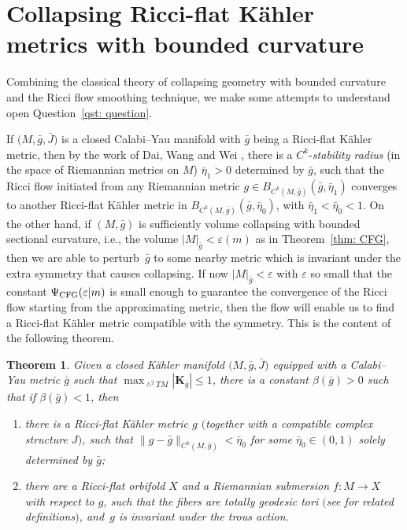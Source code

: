 \documentclass[10pt,a4paper]{amsart}
\numberwithin{equation}{section}
\newtheorem{Theorem}{Theorem}[section]
\begin{document}
\section{Collapsing Ricci-flat K\"ahler metrics with bounded curvature}\label{section5}
Combining the classical theory of collapsing geometry with bounded curvature
and the Ricci flow smoothing technique, we make some attempts to understand open Question~\ref{qst: question}.

If $\big(M,\bar{g},\bar{J}\big)$ is a closed Calabi--Yau manifold with $\bar{g}$ being a
Ricci-flat K\"ahler metric, then by the work of Dai, Wang and Wei \cite{DWW07},
there is a $C^k$-\emph{stability radius} (in the space of Riemannian metrics on
$M$) $\bar{\eta}_1>0$ determined by $\bar{g}$, such that the Ricci
flow initiated from any Riemannian metric $g\in
B_{C^k(M,\bar{g})}(\bar{g},\bar{\eta}_1)$ converges to another Ricci-flat
K\"ahler metric in $B_{C^k(M,\bar{g})}(\bar{g},\bar{\eta}_0)$, with
$\bar{\eta}_1<\bar{\eta}_0<1$. On the other hand, if $(M,\bar{g})$ is
sufficiently volume collapsing with bounded sectional curvature, i.e., the
volume $|M|_{\bar{g}}<\varepsilon(m)$ as in Theorem~\ref{thm: CFG}, then we are
able to perturb~$\bar{g}$ to some nearby metric which is invariant under the
extra symmetry that causes collapsing. If now $|M|_{\bar{g}}<\varepsilon$ with
$\varepsilon$ so small that the constant $\Psi_{\rm CFG}(\varepsilon|m)$ is small
enough to guarantee the convergence of the Ricci flow starting from the
approximating metric, then the flow will enable us to find a Ricci-flat
K\"ahler metric compatible with the symmetry. This is the content of the
following theorem.
\begin{Theorem}\label{thm: main}
Given a closed K\"ahler manifold $\big(M,\bar{g},\bar{J}\big)$ equipped with a
Calabi--Yau metric $\bar{g}$ such that
$\max_{\wedge^2TM} |\mathbf{K}_{\bar{g}} |\le 1$, there is a constant
$\beta(\bar{g})>0$ such that if $\beta(\bar{g})<1$, then
\begin{enumerate}\itemsep=0pt
 \item[$1)$] there is a Ricci-flat K\"ahler metric $g$ $($together with a compatible
 complex structure $J)$, such that $ \|g-\bar{g}
 \|_{C^k(M,\bar{g})} <\bar{\eta}_0$ for some $\bar{\eta}_0\in (0,1)$
 solely determined by $\bar{g}$;
 \item[$2)$] there are a Ricci-flat orbifold $X$ and a Riemannian submersion $f\colon M\to
 X$ with respect to $g$, such that the fibers are totally geodesic tori $($see
{\rm \cite[Section~7]{Fukaya89}} for related definitions$)$, and~$g$ is invariant under the
 trous action.
\end{enumerate}
\end{Theorem}
\end{document}
